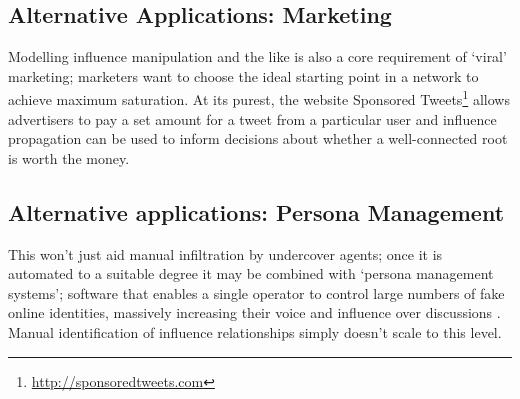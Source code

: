 \subsection{Alternative Applications: Marketing}
Modelling influence manipulation and the like is also a core requirement of
`viral' marketing; marketers want to choose the ideal starting point in a
network to achieve maximum saturation. At its purest, the website
Sponsored Tweets\footnote{\url{http://sponsoredtweets.com}} allows advertisers to pay a set amount for a tweet from a particular user and influence propagation can be used to inform decisions
about whether a well-connected root is worth the money. 

\subsection{Alternative applications: Persona Management}
This won't just aid manual infiltration by undercover agents; once it is
automated to a suitable degree it may be combined with `persona management
systems'; software that enables a single operator to control large numbers of
fake online identities, massively increasing their voice and influence over
discussions \cite{personaPatent}. Manual identification of influence relationships simply doesn't
scale to this level.


% 

